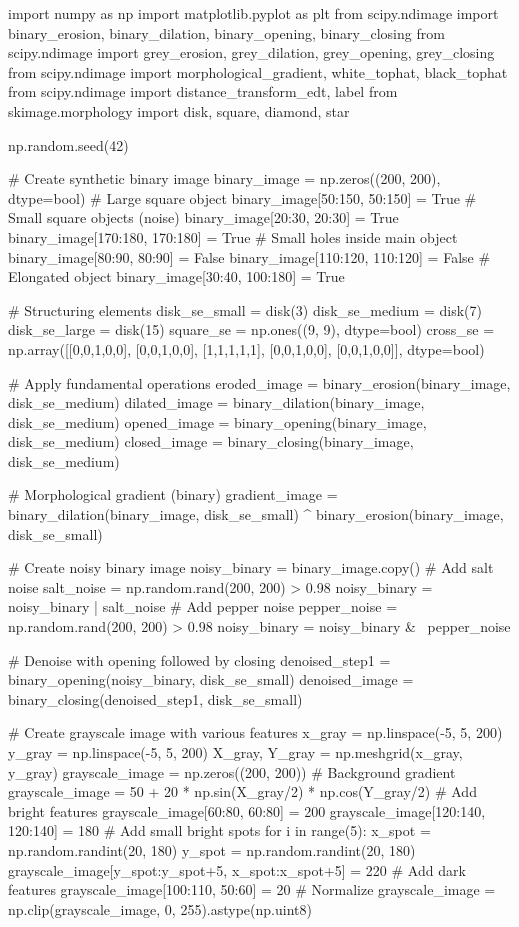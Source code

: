 \documentclass[a4paper, 11pt]{article}
\begin{document}
\begin{pycode}
import numpy as np
import matplotlib.pyplot as plt
from scipy.ndimage import binary_erosion, binary_dilation, binary_opening, binary_closing
from scipy.ndimage import grey_erosion, grey_dilation, grey_opening, grey_closing
from scipy.ndimage import morphological_gradient, white_tophat, black_tophat
from scipy.ndimage import distance_transform_edt, label
from skimage.morphology import disk, square, diamond, star

np.random.seed(42)

# Create synthetic binary image
binary_image = np.zeros((200, 200), dtype=bool)
# Large square object
binary_image[50:150, 50:150] = True
# Small square objects (noise)
binary_image[20:30, 20:30] = True
binary_image[170:180, 170:180] = True
# Small holes inside main object
binary_image[80:90, 80:90] = False
binary_image[110:120, 110:120] = False
# Elongated object
binary_image[30:40, 100:180] = True

# Structuring elements
disk_se_small = disk(3)
disk_se_medium = disk(7)
disk_se_large = disk(15)
square_se = np.ones((9, 9), dtype=bool)
cross_se = np.array([[0,0,1,0,0],
                     [0,0,1,0,0],
                     [1,1,1,1,1],
                     [0,0,1,0,0],
                     [0,0,1,0,0]], dtype=bool)

# Apply fundamental operations
eroded_image = binary_erosion(binary_image, disk_se_medium)
dilated_image = binary_dilation(binary_image, disk_se_medium)
opened_image = binary_opening(binary_image, disk_se_medium)
closed_image = binary_closing(binary_image, disk_se_medium)

# Morphological gradient (binary)
gradient_image = binary_dilation(binary_image, disk_se_small) ^ binary_erosion(binary_image, disk_se_small)

# Create noisy binary image
noisy_binary = binary_image.copy()
# Add salt noise
salt_noise = np.random.rand(200, 200) > 0.98
noisy_binary = noisy_binary | salt_noise
# Add pepper noise
pepper_noise = np.random.rand(200, 200) > 0.98
noisy_binary = noisy_binary & ~pepper_noise

# Denoise with opening followed by closing
denoised_step1 = binary_opening(noisy_binary, disk_se_small)
denoised_image = binary_closing(denoised_step1, disk_se_small)

# Create grayscale image with various features
x_gray = np.linspace(-5, 5, 200)
y_gray = np.linspace(-5, 5, 200)
X_gray, Y_gray = np.meshgrid(x_gray, y_gray)
grayscale_image = np.zeros((200, 200))
# Background gradient
grayscale_image = 50 + 20 * np.sin(X_gray/2) * np.cos(Y_gray/2)
# Add bright features
grayscale_image[60:80, 60:80] = 200
grayscale_image[120:140, 120:140] = 180
# Add small bright spots
for i in range(5):
    x_spot = np.random.randint(20, 180)
    y_spot = np.random.randint(20, 180)
    grayscale_image[y_spot:y_spot+5, x_spot:x_spot+5] = 220
# Add dark features
grayscale_image[100:110, 50:60] = 20
# Normalize
grayscale_image = np.clip(grayscale_image, 0, 255).astype(np.uint8)


\end{pycode}
\end{document}
